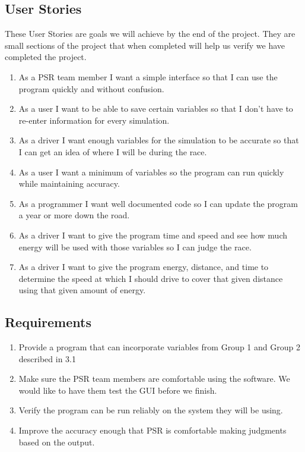 \documentclass[onecolumn, draftclsnofoot,10pt, compsoc]{IEEEtran}
\begin{document}
    \subsection{User Stories}
    These User Stories are goals we will achieve by the end of the project. They are small sections of the project that when completed will help us verify we have completed the project.
    \begin{enumerate}
        \item As a PSR team member I want a simple interface so that I can use the program quickly and without confusion.
        \item As a user I want to be able to save certain variables so that I don't have to re-enter information for every simulation.
        \item As a driver I want enough variables for the simulation to be accurate so that I can get an idea of where I will be during the race.
        \item As a user I want a minimum of variables so the program can run quickly while maintaining accuracy.
        \item As a programmer I want well documented code so I can update the program a year or more down the road.
        \item As a driver I want to give the program time and speed and see how much energy will be used with those variables so I can judge the race.
        \item As a driver I want to give the program energy, distance, and time to determine the speed at which I should drive to cover that given distance using that given amount of energy.
    \end{enumerate}
    
    \subsection{Requirements}
    \begin{enumerate}
        \item Provide a program that can incorporate variables from Group 1 and Group 2 described in 3.1
        \item Make sure the PSR team members are comfortable using the software. We would like to have them test the GUI before we finish.
        \item Verify the program can be run reliably on the system they will be using.
        \item Improve the accuracy enough that PSR is comfortable making judgments based on the output.
    \end{enumerate}
    
\end{document}
